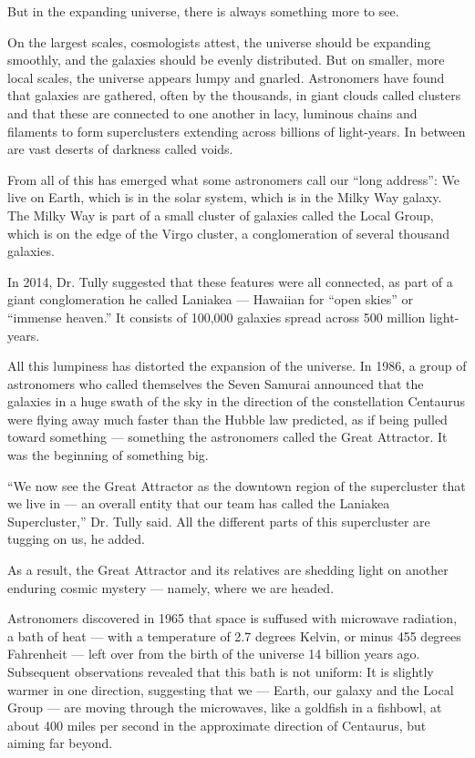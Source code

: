 But in the expanding universe, there is always something more to see.

On the largest scales, cosmologists attest, the universe should be
expanding smoothly, and the galaxies should be evenly distributed. But
on smaller, more local scales, the universe appears lumpy and gnarled.
Astronomers have found that galaxies are gathered, often by the
thousands, in giant clouds called clusters and that these are connected
to one another in lacy, luminous chains and filaments to form
superclusters extending across billions of light-years. In between are
vast deserts of darkness called voids.

From all of this has emerged what some astronomers call our ``long
address'': We live on Earth, which is in the solar system, which is in
the Milky Way galaxy. The Milky Way is part of a small cluster of
galaxies called the Local Group, which is on the edge of the Virgo
cluster, a conglomeration of several thousand galaxies.

In 2014, Dr. Tully suggested that these features were all connected, as
part of a giant conglomeration he called Laniakea --- Hawaiian for
``open skies'' or ``immense heaven.'' It consists of 100,000 galaxies
spread across 500 million light-years.

All this lumpiness has distorted the expansion of the universe. In 1986,
a group of astronomers who called themselves the Seven Samurai announced
that the galaxies in a huge swath of the sky in the direction of the
constellation Centaurus were flying away much faster than the Hubble law
predicted, as if being pulled toward something --- something the
astronomers called the Great Attractor. It was the beginning of
something big.

``We now see the Great Attractor as the downtown region of the
supercluster that we live in --- an overall entity that our team has
called the Laniakea Supercluster,'' Dr. Tully said. All the different
parts of this supercluster are tugging on us, he added.

As a result, the Great Attractor and its relatives are shedding light on
another enduring cosmic mystery --- namely, where we are headed.

Astronomers discovered in 1965 that space is suffused with microwave
radiation, a bath of heat --- with a temperature of 2.7 degrees Kelvin,
or minus 455 degrees Fahrenheit --- left over from the birth of the
universe 14 billion years ago. Subsequent observations revealed that
this bath is not uniform: It is slightly warmer in one direction,
suggesting that we --- Earth, our galaxy and the Local Group --- are
moving through the microwaves, like a goldfish in a fishbowl, at about
400 miles per second in the approximate direction of Centaurus, but
aiming far beyond.

